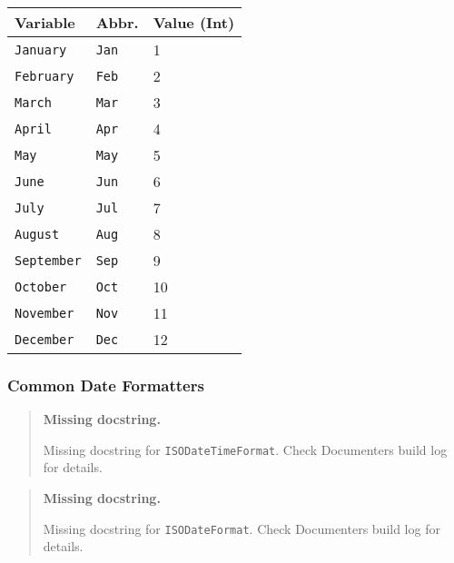 \begin{table}[h]

\begin{tabulary}{\linewidth}{|L|L|L|}
\hline
Variable & Abbr. & Value (Int) \\
\hline
\texttt{January} & \texttt{Jan} & 1 \\
\hline
\texttt{February} & \texttt{Feb} & 2 \\
\hline
\texttt{March} & \texttt{Mar} & 3 \\
\hline
\texttt{April} & \texttt{Apr} & 4 \\
\hline
\texttt{May} & \texttt{May} & 5 \\
\hline
\texttt{June} & \texttt{Jun} & 6 \\
\hline
\texttt{July} & \texttt{Jul} & 7 \\
\hline
\texttt{August} & \texttt{Aug} & 8 \\
\hline
\texttt{September} & \texttt{Sep} & 9 \\
\hline
\texttt{October} & \texttt{Oct} & 10 \\
\hline
\texttt{November} & \texttt{Nov} & 11 \\
\hline
\texttt{December} & \texttt{Dec} & 12 \\
\hline
\end{tabulary}

\end{table}



\hypertarget{11492660681477193334}{}


\subsubsection{Common Date Formatters}



\begin{quote}
\textbf{Missing docstring.}

Missing docstring for \texttt{ISODateTimeFormat}. Check Documenter{\textquotesingle}s build log for details.

\end{quote}


\begin{quote}
\textbf{Missing docstring.}

Missing docstring for \texttt{ISODateFormat}. Check Documenter{\textquotesingle}s build log for details.

\end{quote}


